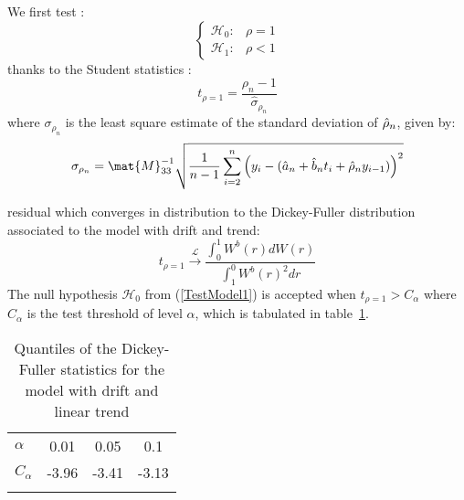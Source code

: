 We first test :
\begin{equation}\label{TestModel1}
  \left\{
  \begin{array}{lr}
    \mathcal{H}_0 :  & \rho = 1 \\
    \mathcal{H}_1 : & \rho < 1
  \end{array}
  \right.
\end{equation}
thanks to the Student statistics :
\begin{equation}\label{stdtStat}
  t_{\rho=1} = \frac{\rho_n-1}{\hat{\sigma}_{\rho_n}}
\end{equation}
where $\sigma_{\rho_n}$ is the least square estimate of the standard deviation of $\Hat{\rho}_n$, given by:
\begin{equation}
  \sigma_{\rho_n}=\mat{M}^{-1}_{33}\sqrt{\frac{1}{n-1}\sum_{i=2}^n\left(y_{i}-(\hat{a}_n+\hat{b}_nt_i+\hat{\rho}_ny_{i-1})\right)^2}
\end{equation}

residual which converges in distribution to the Dickey-Fuller distribution associated to the model with drift and trend:
\begin{equation}
  t_{\rho = 1} \stackrel{\mathcal{L}}{\longrightarrow} \frac{\int_{0}^{1}W^{b}(r) dW(r)}{\int_{1}^{0} W^{b}(r)^2 dr}
\end{equation}
The null hypothesis $\mathcal{H}_0$ from (\ref{TestModel1}) is accepted when $t_{\rho=1} > C_{\alpha}$ where $C_{\alpha}$ is the test threshold of level $\alpha$, which is tabulated in table~\ref{DickeyFullerPval1}.\\

\begin{table}
  \centering
  \begin{tabular}{lccc}
    \hline\noalign{\smallskip}
    $\alpha$ & 0.01 & 0.05 & 0.1 \\
    \noalign{\smallskip}\hline\noalign{\smallskip}
    $C_{\alpha}$ & -3.96 & -3.41 & -3.13 \\
    \noalign{\smallskip}\hline
  \end{tabular}
  \caption{Quantiles of the Dickey-Fuller statistics for the model with drift and linear trend}\label{DickeyFullerPval1}
\end{table}


